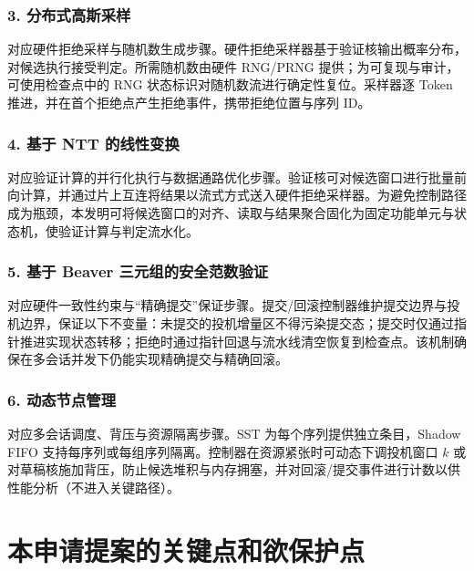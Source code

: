 \documentclass[12pt,a4paper]{article}
\begin{document}
\subsubsection{3. 分布式高斯采样}

对应硬件拒绝采样与随机数生成步骤。硬件拒绝采样器基于验证核输出概率分布，对候选执行接受判定。所需随机数由硬件 RNG/PRNG 提供；为可复现与审计，可使用检查点中的 RNG 状态标识对随机数流进行确定性复位。采样器逐 Token 推进，并在首个拒绝点产生拒绝事件，携带拒绝位置与序列 ID。

\subsubsection{4. 基于 NTT 的线性变换}

对应验证计算的并行化执行与数据通路优化步骤。验证核可对候选窗口进行批量前向计算，并通过片上互连将结果以流式方式送入硬件拒绝采样器。为避免控制路径成为瓶颈，本发明可将候选窗口的对齐、读取与结果聚合固化为固定功能单元与状态机，使验证计算与判定流水化。

\subsubsection{5. 基于 Beaver 三元组的安全范数验证}

对应硬件一致性约束与“精确提交”保证步骤。提交/回滚控制器维护提交边界与投机边界，保证以下不变量：未提交的投机增量区不得污染提交态；提交时仅通过指针推进实现状态转移；拒绝时通过指针回退与流水线清空恢复到检查点。该机制确保在多会话并发下仍能实现精确提交与精确回滚。

\subsubsection{6. 动态节点管理}

对应多会话调度、背压与资源隔离步骤。SST 为每个序列提供独立条目，Shadow FIFO 支持每序列或每组序列隔离。控制器在资源紧张时可动态下调投机窗口 $k$ 或对草稿核施加背压，防止候选堆积与内存拥塞，并对回滚/提交事件进行计数以供性能分析（不进入关键路径）。

\section{本申请提案的关键点和欲保护点}
\end{document}
